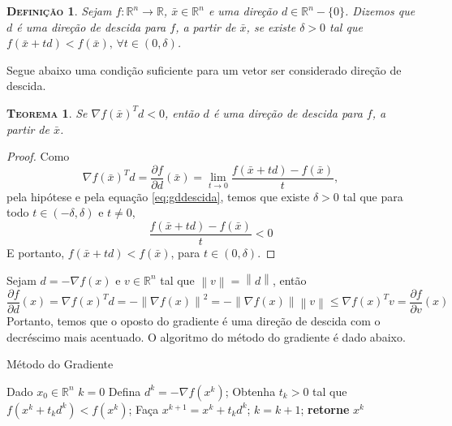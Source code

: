 \documentclass[
	12pt,				%
    oneside,			%
	a4paper,			%
	english,			%
	french,				%
	spanish,			%
	brazil,				%
	]{abntex2}
\newtheorem{theorem}{\scshape Teorema}[section]
\newtheorem{definicao}{\scshape Defini\c{c}\~ao}[section]
\newcommand{\norm}[1]{\left\lVert#1\right\rVert}
\begin{document}
        \begin{definicao}
            Sejam $f:\mathbb{R}^n \to \mathbb{R}$, $\bar{x}\in\mathbb{R}^n$ e uma direção $d\in\mathbb{R}^n-\{0\}$. Dizemos que $d$ é uma direção de descida para $f$, a partir de $\bar{x}$, se existe $\delta > 0$ tal que $f(\bar{x} + td) < f(\bar{x})\mbox{, } \forall t\in(0,\delta)$.
        \end{definicao}

        Segue abaixo uma condição suficiente para um vetor ser considerado direção de descida.

        \begin{theorem}
            Se $\nabla f(\bar{x})^Td < 0$, então $d$ é uma direção de descida para $f$, a partir de $\bar{x}$.
        \end{theorem}
        \begin{proof}
            Como
            \begin{equation}\label{eq:gddescida}
                \nabla f(\bar{x})^Td = \frac{\partial f}{\partial d}(\bar{x}) = \lim_{t \to 0} \frac{f(\bar{x} + td) - f(\bar{x})}{t},
            \end{equation}
            pela hipótese e pela equação \eqref{eq:gddescida}, temos que existe $\delta > 0$ tal que para todo $t \in (-\delta, \delta)$ e $t \neq 0$,
            \begin{equation*}
                \frac{f(\bar{x} + td) - f(\bar{x})}{t} < 0
            \end{equation*}
            E portanto, $f(\bar{x} + td) < f(\bar{x})$, para $t \in (0,\delta)$.
        \end{proof}

        Sejam $d = - \nabla f(x)$ e $v \in \mathbb{R}^n$ tal que $\norm{v} = \norm{d}$, então
        \[\frac{\partial f}{\partial d}(x) = \nabla f(x)^T d = - \norm{\nabla f(x)}^2 = -\norm{\nabla f(x)}\norm{v} \leq \nabla f(x)^T v = \frac{\partial f}{\partial v}(x)\]
        Portanto, temos que o oposto do gradiente é uma direção de descida com o decréscimo mais acentuado. O algoritmo do método do gradiente é dado abaixo.
        \begin{algorithm}
            \caption{Método do Gradiente}
            \label{alg:gd}
            \begin{algorithmic}[1]
                \State Dado $x_0 \in \mathbb{R}^n$
                \State $k = 0$
                    \State Defina $d^k = - \nabla f(x^k)$;
                    \State Obtenha $t_k > 0$ tal que $f(x^k + t_k d^k) < f(x^k)$;
                    \State Faça $x^{k+1} = x^k + t_k d^k$;
                    \State $k = k+1$;
                \EndWhile
                \State \textbf{retorne} $x^k$
            \end{algorithmic}
        \end{algorithm}
\end{document}

